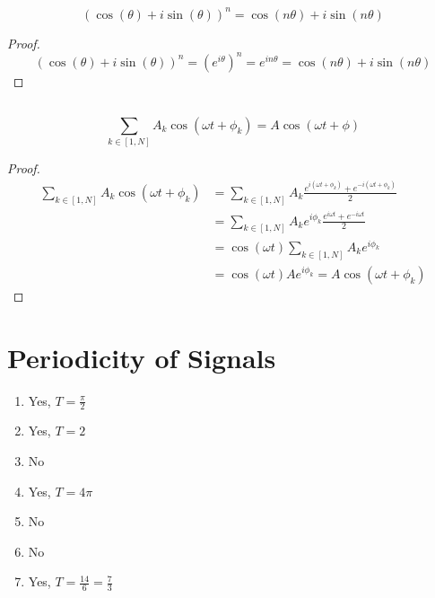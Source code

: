 \documentclass{article}
\begin{document}
\begin{theorem}
    \begin{equation}
        (\cos(\theta) + i \sin(\theta))^n = \cos(n \theta) + i \sin(n \theta)
    \end{equation}
\end{theorem}
\begin{proof}
    \begin{equation} 
        (\cos(\theta) + i \sin(\theta))^n = (e^{i \theta})^n = e^{i n \theta} = \cos(n \theta) + i \sin(n \theta)
    \end{equation}
\end{proof}

\subsection{}

\begin{theorem}
    \begin{equation}
        \sum_{k \in [1, N]} A_k \cos(\omega t + \phi_k) = A \cos(\omega t + \phi)
    \end{equation}
\end{theorem}
\begin{proof}
    \begin{align}
        \sum_{k \in [1, N]} A_k \cos(\omega t + \phi_k) &= \sum_{k \in [1, N]} A_k \frac{e^{i (\omega t + \phi_k)} + e^{-i (\omega t + \phi_k)}}{2} \\
        &= \sum_{k \in [1, N]} A_k e^{i \phi_k} \frac{e^{i \omega t} + e^{-i \omega t}}{2} \\
        &= \cos(\omega t) \sum_{k \in [1, N]} A_k e^{i \phi_k} \\
        &= \cos(\omega t) A e^{i \phi_k} = A \cos(\omega t + \phi_k)
    \end{align}
\end{proof}

\section{Periodicity of Signals}

\begin{enumerate}
    \item Yes, \(T = \frac{\pi}{2}\)
    \item Yes, \(T = 2\)
    \item No
    \item Yes, \(T = 4 \pi\)
    \item No
    \item No
    \item Yes, \(T = \frac{14}{6} = \frac{7}{3}\)
\end{enumerate}
\end{document}
